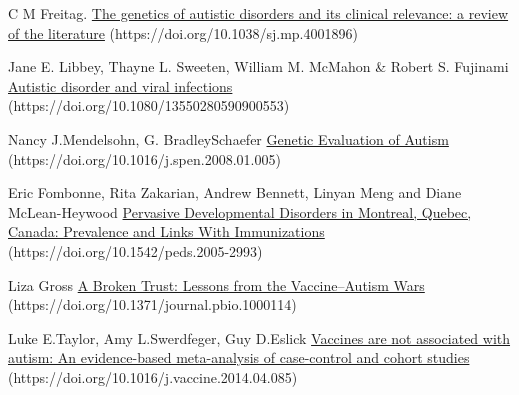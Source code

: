 \documentclass[10pt]{article}
\begin{document}
\begin{thebibliography}{9}

C M Freitag.
\href{https://doi.org/10.1038/sj.mp.4001896}{The genetics of autistic disorders and its clinical relevance: a review of the literature} (https://doi.org/10.1038/sj.mp.4001896)

Jane E. Libbey, Thayne L. Sweeten, William M. McMahon \& Robert S. Fujinami
\href{https://doi.org/10.1080/13550280590900553}{Autistic disorder and viral infections} (https://doi.org/10.1080/13550280590900553)

Nancy J.Mendelsohn, G. BradleySchaefer
\href{https://doi.org/10.1016/j.spen.2008.01.005}{Genetic Evaluation of Autism} (https://doi.org/10.1016/j.spen.2008.01.005)

Eric Fombonne, Rita Zakarian, Andrew Bennett, Linyan Meng and Diane McLean-Heywood
\href{https://doi.org/10.1542/peds.2005-2993}{Pervasive Developmental Disorders in Montreal, Quebec, Canada: Prevalence and Links With Immunizations} (https://doi.org/10.1542/peds.2005-2993)

Liza Gross
\href{https://doi.org/10.1371/journal.pbio.1000114}{A Broken Trust: Lessons from the Vaccine–Autism Wars} (https://doi.org/10.1371/journal.pbio.1000114)

Luke E.Taylor, Amy L.Swerdfeger, Guy D.Eslick
\href{https://doi.org/10.1016/j.vaccine.2014.04.085}{Vaccines are not associated with autism: An evidence-based meta-analysis of case-control and cohort studies} (https://doi.org/10.1016/j.vaccine.2014.04.085)

\end{thebibliography}
\end{document}

